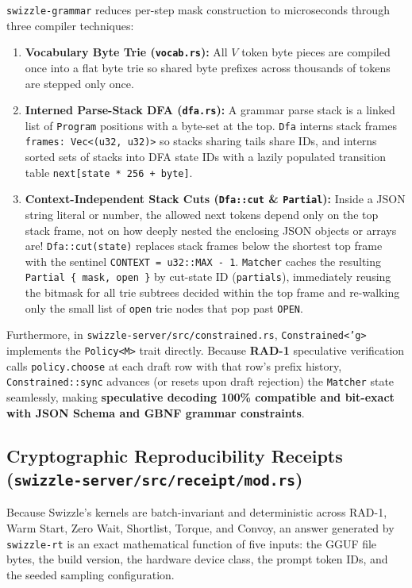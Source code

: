 \documentclass[10pt,a4paper]{article}
\theoremstyle{swzstyle}
\newcommand{\code}[1]{\texttt{#1}}
\begin{document}
\code{swizzle-grammar} reduces per-step mask construction to microseconds through three compiler techniques:
\begin{enumerate}
  \item \textbf{Vocabulary Byte Trie (\code{vocab.rs}):} All $V$ token byte pieces are compiled once into a flat byte trie so shared byte prefixes across thousands of tokens are stepped only once.
  \item \textbf{Interned Parse-Stack DFA (\code{dfa.rs}):} A grammar parse stack is a linked list of \code{Program} positions with a byte-set at the top. \code{Dfa} interns stack frames \code{frames: Vec<(u32, u32)>} so stacks sharing tails share IDs, and interns sorted sets of stacks into DFA state IDs with a lazily populated transition table \code{next[state * 256 + byte]}.
  \item \textbf{Context-Independent Stack Cuts (\code{Dfa::cut} \& \code{Partial}):} Inside a JSON string literal or number, the allowed next tokens depend only on the top stack frame, not on how deeply nested the enclosing JSON objects or arrays are! \code{Dfa::cut(state)} replaces stack frames below the shortest top frame with the sentinel \code{CONTEXT = u32::MAX - 1}. \code{Matcher} caches the resulting \code{Partial \{ mask, open \}} by cut-state ID (\code{partials}), immediately reusing the bitmask for all trie subtrees decided within the top frame and re-walking only the small list of \code{open} trie nodes that pop past \code{OPEN}.
\end{enumerate}

Furthermore, in \code{swizzle-server/src/constrained.rs}, \code{Constrained<'g>} implements the \code{Policy<M>} trait directly. Because \textbf{RAD-1} speculative verification calls \code{policy.choose} at each draft row with that row's prefix history, \code{Constrained::sync} advances (or resets upon draft rejection) the \code{Matcher} state seamlessly, making \textbf{speculative decoding 100\% compatible and bit-exact with JSON Schema and GBNF grammar constraints}.

\subsection{Cryptographic Reproducibility Receipts (\texttt{swizzle-server/src/receipt/mod.rs})}

Because Swizzle's kernels are batch-invariant and deterministic across RAD-1, Warm Start, Zero Wait, Shortlist, Torque, and Convoy, an answer generated by \code{swizzle-rt} is an exact mathematical function of five inputs: the GGUF file bytes, the build version, the hardware device class, the prompt token IDs, and the seeded sampling configuration.
\end{document}
